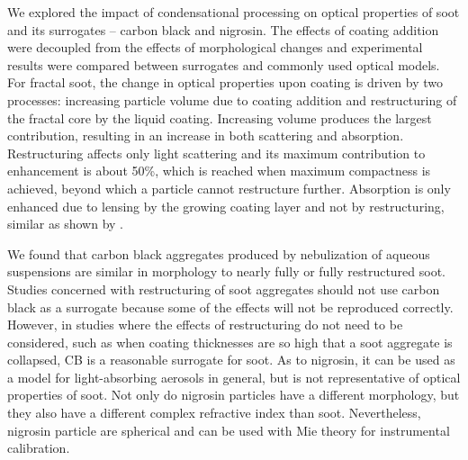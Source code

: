 
We explored the impact of condensational processing on optical properties of soot and its surrogates -- carbon black and nigrosin. The effects of coating addition were decoupled from the effects of morphological changes and experimental results were compared between surrogates and commonly used optical models.
For fractal soot, the change in optical properties upon coating is driven by two processes: increasing particle volume due to coating addition and restructuring of the fractal core by the liquid coating. Increasing volume produces the largest contribution, resulting in an increase in both scattering and absorption. Restructuring affects only light scattering and its maximum contribution to enhancement is about 50\%, which is reached when maximum compactness is achieved, beyond which a particle cannot restructure further. Absorption is only enhanced due to lensing by the growing coating layer and not by restructuring, similar as shown by \citet{RN67}. 


We found that carbon black aggregates produced by nebulization of aqueous suspensions are similar in morphology to nearly fully or fully restructured soot. Studies concerned with restructuring of soot aggregates should not use carbon black as a surrogate because some of the effects will not be reproduced correctly. However, in studies where the effects of restructuring do not need to be considered, such as when coating thicknesses are so high that a soot aggregate is collapsed, CB is a reasonable surrogate for soot. As to nigrosin, it can be used as a model for light-absorbing aerosols in general, but is not representative of optical properties of soot. Not only do nigrosin particles have a different morphology, but they also have a different complex refractive index than soot. Nevertheless, nigrosin particle are spherical and can be used with Mie theory for instrumental calibration.

